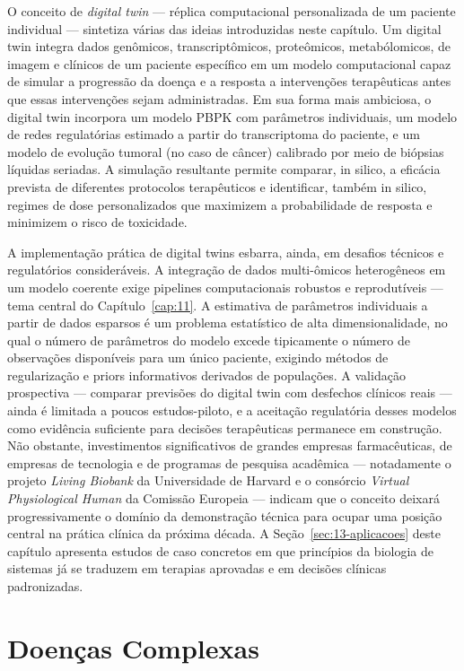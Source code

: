 O conceito de \emph{digital twin} --- réplica computacional personalizada de um paciente individual --- sintetiza várias das ideias introduzidas neste capítulo. Um digital twin integra dados genômicos, transcriptômicos, proteômicos, metabólomicos, de imagem e clínicos de um paciente específico em um modelo computacional capaz de simular a progressão da doença e a resposta a intervenções terapêuticas antes que essas intervenções sejam administradas. Em sua forma mais ambiciosa, o digital twin incorpora um modelo PBPK com parâmetros individuais, um modelo de redes regulatórias estimado a partir do transcriptoma do paciente, e um modelo de evolução tumoral (no caso de câncer) calibrado por meio de biópsias líquidas seriadas. A simulação resultante permite comparar, in silico, a eficácia prevista de diferentes protocolos terapêuticos e identificar, também in silico, regimes de dose personalizados que maximizem a probabilidade de resposta e minimizem o risco de toxicidade.

A implementação prática de digital twins esbarra, ainda, em desafios técnicos e regulatórios consideráveis. A integração de dados multi-ômicos heterogêneos em um modelo coerente exige pipelines computacionais robustos e reprodutíveis --- tema central do Capítulo~\ref{cap:11}. A estimativa de parâmetros individuais a partir de dados esparsos é um problema estatístico de alta dimensionalidade, no qual o número de parâmetros do modelo excede tipicamente o número de observações disponíveis para um único paciente, exigindo métodos de regularização e priors informativos derivados de populações. A validação prospectiva --- comparar previsões do digital twin com desfechos clínicos reais --- ainda é limitada a poucos estudos-piloto, e a aceitação regulatória desses modelos como evidência suficiente para decisões terapêuticas permanece em construção. Não obstante, investimentos significativos de grandes empresas farmacêuticas, de empresas de tecnologia e de programas de pesquisa acadêmica --- notadamente o projeto \emph{Living Biobank} da Universidade de Harvard e o consórcio \emph{Virtual Physiological Human} da Comissão Europeia --- indicam que o conceito deixará progressivamente o domínio da demonstração técnica para ocupar uma posição central na prática clínica da próxima década. A Seção~\ref{sec:13-aplicacoes} deste capítulo apresenta estudos de caso concretos em que princípios da biologia de sistemas já se traduzem em terapias aprovadas e em decisões clínicas padronizadas.


\section{Doenças Complexas}
\label{sec:13-doencas}

